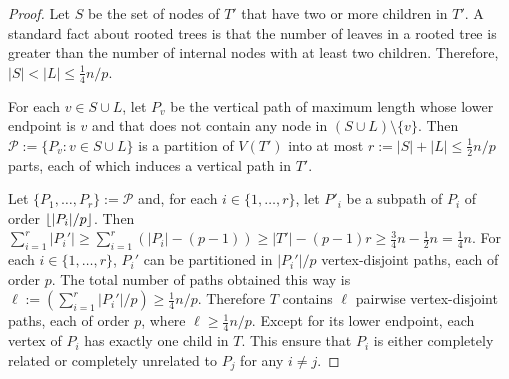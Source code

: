 \documentclass[kpfonts,lotsofwhite]{patmorin}
\DeclarePairedDelimiter{\floor}{\lfloor}{\rfloor}
\renewcommand{\ge}{\geqslant}
\renewcommand{\le}{\leqslant}
\theoremstyle{plain}
\theoremstyle{definition}
\begin{document}
\begin{proof}
  Let $S$ be the set of nodes of $T'$ that have two or more children in $T'$.  A standard fact about rooted trees is that the number of leaves in a rooted tree is greater than the number of internal nodes with at least two children.  Therefore, $|S|<|L|\le \tfrac{1}{4}n/p$.

  For each $v\in S\cup L$, let $P_v$ be the vertical path of maximum length whose lower endpoint is $v$ and that does not contain any node in $(S\cup L)\setminus \{v\}$.  Then $\mathcal{P}:=\{P_v:v\in S\cup L\}$ is a partition of $V(T')$ into at most $r:=|S|+|L|\le \tfrac{1}{2}n/p$ parts, each of which induces a vertical path in $T'$.

  Let $\{P_1,\ldots,P_r\}:=\mathcal{P}$ and, for each $i\in\{1,\ldots,r\}$, let $P'_i$ be a subpath of $P_i$ of order $\floor{|P_i|/p}$.  Then $\sum_{i=1}^r |P_i'|\ge \sum_{i=1}^r (|P_i|-(p-1)) \ge |T'| - (p-1)r\ge \tfrac{3}{4}n-\tfrac{1}{2}n=\tfrac{1}{4}n$. For each $i\in\{1,\ldots,r\}$, $P_i'$ can be partitioned in $|P_i'|/p$ vertex-disjoint paths, each of order $p$.  The total number of paths obtained this way is $\ell := (\sum_{i=1}^r |P_i'|/p) \ge \tfrac{1}{4}n/p$.  Therefore $T$ contains $\ell$ pairwise vertex-disjoint paths, each of order $p$, where $\ell\ge \tfrac{1}{4}n/p$.  Except for its lower endpoint, each vertex of $P_i$ has exactly one child in $T$.  This ensure that $P_i$ is either completely related or completely unrelated to $P_j$ for any $i\neq j$.
\end{proof}
\end{document}
